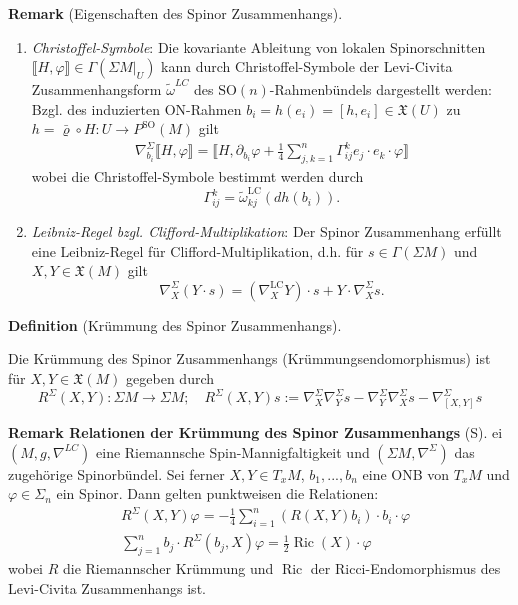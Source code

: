 \documentclass[10pt, letterpaper]{article}
\newcommand{\SO}{\mathrm{SO}}
\newcommand{\CustomHeading}[3]{%
  \par\medskip\noindent%
  \textbf{#1 #2} \textnormal{(#3)}.\enskip%
}
\newenvironment{DEF}[2]{\CustomHeading{Definition}{#1}{#2}}{}
\newenvironment{REM}[2]{\CustomHeading{Remark}{#1}{#2}}{}
\begin{document}
\begin{REM}{}{Eigenschaften des Spinor Zusammenhangs}
  \begin{enumerate}
    \item \emph{Christoffel-Symbole}: Die kovariante Ableitung von lokalen Spinorschnitten $\llbracket H, \varphi \rrbracket \in \Gamma(\Sigma M|_U)$ kann durch Christoffel-Symbole der Levi-Civita Zusammenhangsform $\widetilde\omega^{LC}$ des $\SO(n)$-Rahmenbündels dargestellt werden: Bzgl. des induzierten ON-Rahmen $b_i=h(e_i)=[h,e_i]\in\mathfrak{X}(U)$ zu $h=\bar\varrho\circ H:U\to P ^\SO(M)$ gilt
    $$
    \begin{aligned}
    \nabla_{b_i}^{\Sigma} \llbracket H, \varphi \rrbracket = \llbracket H, \partial_{b_i} \varphi+\frac{1}{4} \sum_{j, k=1}^n \Gamma_{i j}^k e_j \cdot e_k \cdot \varphi \rrbracket
    \end{aligned}
    $$
    wobei die Christoffel-Symbole bestimmt werden durch 
    $$\Gamma_{i j}^k=\widetilde\omega_{k j}^{\mathrm{LC}}\left(d h\left(b_i\right)\right).$$
    \item \emph{Leibniz-Regel bzgl. Clifford-Multiplikation}:  Der Spinor Zusammenhang erfüllt eine Leibniz-Regel für Clifford-Multiplikation, d.h. für $s\in\Gamma(\Sigma M)$ und $X, Y \in \mathfrak{X}(M)$ gilt
    $$
    \nabla_X^{\Sigma}(Y \cdot s)=\left(\nabla_X^{\mathrm{LC}} Y\right) \cdot s+Y \cdot \nabla_X^{\Sigma} s.
    $$
  \end{enumerate}
\end{REM}


\begin{DEF}{}{Krümmung des Spinor Zusammenhangs}
  Die Krümmung des Spinor Zusammenhangs (Krümmungsendomorphismus) ist für $X,Y\in\mathfrak{X}(M)$ gegeben durch 
    $$R^{\Sigma}(X, Y): \Sigma M \rightarrow \Sigma M;\quad R^{\Sigma}(X, Y) s:=\nabla_X^{\Sigma} \nabla_Y^{\Sigma} s-\nabla_Y^{\Sigma} \nabla_X^{\Sigma} s-\nabla_{[X, Y]}^{\Sigma} s$$
\end{DEF}


\begin{REM}{Relationen der Krümmung des Spinor Zusammenhangs}
  Sei $(M,g,\nabla^{LC})$ eine Riemannsche Spin-Mannigfaltigkeit und $(\Sigma M,\nabla^\Sigma)$ das zugehörige Spinorbündel. Sei ferner $X,Y\in T_x M$, $b_1,...,b_n$ eine ONB von $T_xM$ und $\varphi\in \Sigma_n$ ein Spinor. Dann gelten punktweisen die Relationen:
  $$
  \begin{aligned}
    &R^{\Sigma}(X, Y) \varphi =-\frac{1}{4} \sum_{i=1}^n\left(R(X, Y) b_i\right) \cdot b_i \cdot \varphi\\
    &\sum_{j=1}^n b_j \cdot R^{\Sigma}\left(b_j, X\right) \varphi=\frac{1}{2} \operatorname{Ric}(X) \cdot \varphi
  \end{aligned}
  $$
  wobei $R$ die Riemannscher Krümmung und $\operatorname{Ric}$ der Ricci-Endomorphismus des Levi-Civita Zusammenhangs ist. 
\end{REM}
\end{document}
